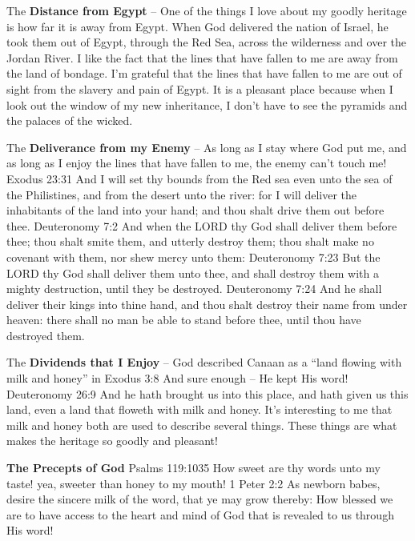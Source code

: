 \begin{compactenum}[I.][8]
    \item The \textbf{Distance from Egypt} – One of the things I love about my goodly heritage is how far it is away from Egypt.
When God delivered the nation of Israel, he took them out of Egypt, through the Red Sea, across the wilderness and over the Jordan River.
I like the fact that the lines that have fallen to me are away from the land of bondage.
I’m grateful that the lines that have fallen to me are out of sight from the slavery and pain of Egypt.
It is a pleasant place because when I look out the window of my new inheritance, I don’t have to see the pyramids and the palaces of the wicked.
    \item The \textbf{Deliverance from my Enemy} – As long as I stay where God put me, and as long as I enjoy the lines that have fallen to me, the enemy can’t touch me!
Exodus 23:31 And I will set thy bounds from the Red sea even unto the sea of the Philistines, and from the desert unto the river: for I will deliver the inhabitants of the land into your hand; and thou shalt drive them out before thee.
Deuteronomy 7:2  And when the LORD thy God shall deliver them before thee; thou shalt smite them, and utterly destroy them; thou shalt make no covenant with them, nor shew mercy unto them:
Deuteronomy 7:23 But the LORD thy God shall deliver them unto thee, and shall destroy them with a mighty destruction, until they be destroyed.
Deuteronomy 7:24 And he shall deliver their kings into thine hand, and thou shalt destroy their name from under heaven: there shall no man be able to stand before thee, until thou have destroyed them.
    \item The \textbf{Dividends that I Enjoy} – God described Canaan as a “land flowing with milk and honey” in Exodus 3:8
And sure enough – He kept His word!
Deuteronomy 26:9 And he hath brought us into this place, and hath given us this land, even a land that floweth with milk and honey.
It’s interesting to me that milk and honey both are used to describe several things.
These things are what makes the heritage so goodly and pleasant!\\
    \begin{compactenum}[A.][8]
        \item \textbf{The Precepts of God}
Psalms 119:1035 How sweet are thy words unto my taste! yea, sweeter than honey to my mouth!
1 Peter 2:2  As newborn babes, desire the sincere milk of the word, that ye may grow thereby:
How blessed we are to have access to the heart and mind of God that is revealed to us through His word!

\end{compactenum}
\end{compactenum}
